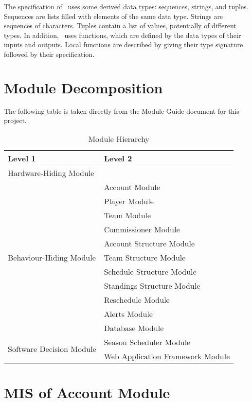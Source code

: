 \documentclass[12pt, titlepage]{article}
\begin{document}
\noindent
The specification of \progname \ uses some derived data types: sequences, strings, and
tuples. Sequences are lists filled with elements of the same data type. Strings
are sequences of characters. Tuples contain a list of values, potentially of
different types. In addition, \progname \ uses functions, which
are defined by the data types of their inputs and outputs. Local functions are
described by giving their type signature followed by their specification.

\section{Module Decomposition}

The following table is taken directly from the Module Guide document for this project.

\begin{table}[h!]
\centering
\begin{tabular}{p{} p{}}
\toprule
\textbf{Level 1} & \textbf{Level 2}\\
\midrule

{Hardware-Hiding Module} & ~ \\
\midrule

\multirow{11}{0.3\textwidth}{Behaviour-Hiding Module} & Account Module\\
& Player Module\\
& Team Module\\
& Commissioner Module\\
& Account Structure Module\\
& Team Structure Module\\
& Schedule Structure Module\\
& Standings Structure Module\\
& Reschedule Module\\
& Alerts Module\\
& Database Module\\
\midrule

\multirow{2}{0.3\textwidth}{Software Decision Module} & Season Scheduler
Module\\
& Web Application Framework Module\\
\bottomrule

\end{tabular}
\caption{Module Hierarchy}
\label{TblMH}
\end{table}

\newpage

\section{MIS of Account Module} \label{mAC}
\end{document}

